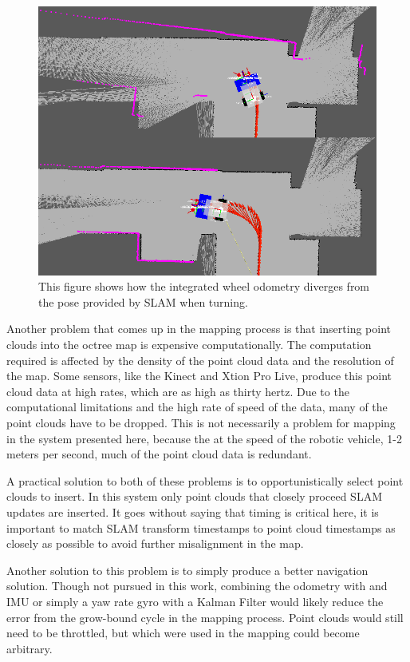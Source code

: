\documentclass[12pt]{report}
\begin{document}
\begin{figure}[ht]
  \centering
  \includegraphics[width=6in,keepaspectratio]{uncertainty.png}
  \caption{This figure shows how the integrated wheel odometry diverges from the pose provided by SLAM when turning.}
  \label{fig:uncertainty}
\end{figure}

Another problem that comes up in the mapping process is that inserting point clouds into the octree map is expensive computationally.  The computation required is affected by the density of the point cloud data and the resolution of the map.  Some sensors, like the Kinect and Xtion Pro Live, produce this point cloud data at high rates, which are as high as thirty hertz.  Due to the computational limitations and the high rate of speed of the data, many of the point clouds have to be dropped.  This is not necessarily a problem for mapping in the system presented here, because the at the speed of the robotic vehicle, 1-2 meters per second, much of the point cloud data is redundant.

A practical solution to both of these problems is to opportunistically select point clouds to insert.  In this system only point clouds that closely proceed SLAM updates are inserted.  It goes without saying that timing is critical here, it is important to match SLAM transform timestamps to point cloud timestamps as closely as possible to avoid further misalignment in the map.

Another solution to this problem is to simply produce a better navigation solution.  Though not pursued in this work, combining the odometry with and IMU or simply a yaw rate gyro with a Kalman Filter would likely reduce the error from the grow-bound cycle in the mapping process.  Point clouds would still need to be throttled, but which were used in the mapping could become arbitrary.
\end{document}

